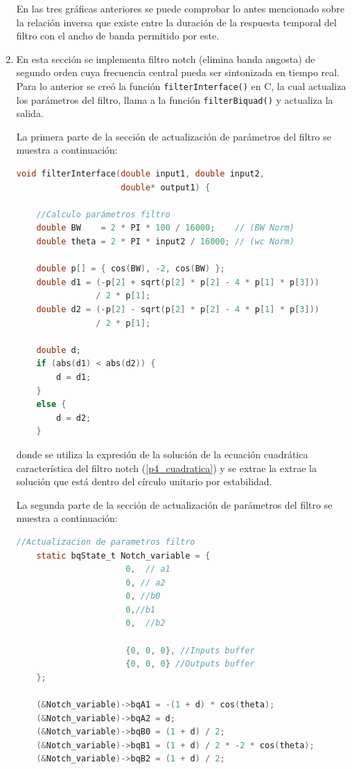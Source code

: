 \begin{enumerate}
En las tres gráficas anteriores se puede comprobar lo antes mencionado sobre la relación inversa que existe entre la duración de la respuesta temporal del filtro con el ancho de banda permitido por este.

\item En esta sección se implementa filtro notch (elimina banda angosta) de segundo orden cuya frecuencia central pueda ser sintonizada en tiempo real. Para lo anterior se creó la función \texttt{filterInterface()} en C, la cual actualiza los parámetros del filtro, llama a la función \texttt{filterBiquad()} y actualiza la salida.

La primera parte de la sección de actualización de parámetros del filtro se muestra a continuación:\clearpage
\begin{lstlisting}[language = C]
void filterInterface(double input1, double input2,
                     double* output1) {

    //Calculo parámetros filtro
    double BW    = 2 * PI * 100 / 16000;    // (BW Norm)
    double theta = 2 * PI * input2 / 16000; // (wc Norm)

    double p[] = { cos(BW), -2, cos(BW) };
    double d1 = (-p[2] + sqrt(p[2] * p[2] - 4 * p[1] * p[3])) 
                / 2 * p[1];
    double d2 = (-p[2] - sqrt(p[2] * p[2] - 4 * p[1] * p[3])) 
                / 2 * p[1];

    double d;
    if (abs(d1) < abs(d2)) {
        d = d1;
    }
    else {
        d = d2;
    }
\end{lstlisting}
donde se utiliza la expresión de la solución de la ecuación cuadrática característica del filtro notch (\ref{p4_cuadratica}) y se extrae la extrae la solución que está dentro del círculo unitario por estabilidad.

La segunda parte de la sección de actualización de parámetros del filtro se muestra a continuación:
\begin{lstlisting}[language = C]
    //Actualizacion de parametros filtro
    static bqState_t Notch_variable = {
                      0,  // a1
                      0, // a2
                      0, //b0
                      0,//b1
                      0,  //b2

                      {0, 0, 0}, //Inputs buffer
                      {0, 0, 0} //Outputs buffer
    };

    (&Notch_variable)->bqA1 = -(1 + d) * cos(theta);
    (&Notch_variable)->bqA2 = d;
    (&Notch_variable)->bqB0 = (1 + d) / 2;
    (&Notch_variable)->bqB1 = (1 + d) / 2 * -2 * cos(theta);
    (&Notch_variable)->bqB2 = (1 + d) / 2;


\end{lstlisting}
\end{enumerate}
